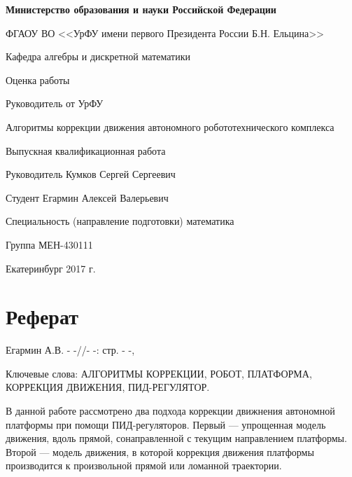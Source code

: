 \documentclass[12pt]{report}
\begin{document}
\pagestyle{empty} %
\begin{center}
\small\bf Министерство образования и науки Российской Федерации

ФГАОУ ВО <<УрФУ имени первого Президента России Б.Н. Ельцина>>

\rm Кафедра алгебры и дискретной математики
\end{center}

\normalsize
\vspace{2cm}

\begin{flushright}
  Оценка работы\underline{\hspace{4cm}}

  Руководитель от УрФУ\underline{\hspace{4cm}}
\end{flushright}

\vspace{3cm}
\begin{center}
Алгоритмы коррекции движения автономного робототехнического комплекса

\vspace{1cm}\normalsize
Выпускная квалификационная работа
\end{center}

\vspace{200pt}
Руководитель	\underline{\hspace{8,6cm}} Кумков Сергей Сергеевич

Студент \underline{\hspace{9,1cm}}	Егармин Алексей Валерьевич


\small Специальность (направление подготовки) математика

Группа МЕН-430111
\vspace{33pt}
\normalsize
\begin{center}
Екатеринбург 2017 г.
\end{center}

\newpage
\pagestyle{plain} %
\chapter*{Реферат}
Егармин А.В. - -//- -: стр. - -,

Ключевые слова: АЛГОРИТМЫ КОРРЕКЦИИ, РОБОТ, ПЛАТФОРМА, КОРРЕКЦИЯ ДВИЖЕНИЯ, ПИД-РЕГУЛЯТОР.

В данной работе рассмотрено два подхода коррекции движнения автономной платформы при помощи ПИД-регуляторов. Первый --- упрощенная модель движения, вдоль прямой, сонаправленной с текущим направлением платформы. Второй --- модель движения, в которой коррекция движения платформы производится к произвольной прямой или ломанной траектории.
\end{document}
